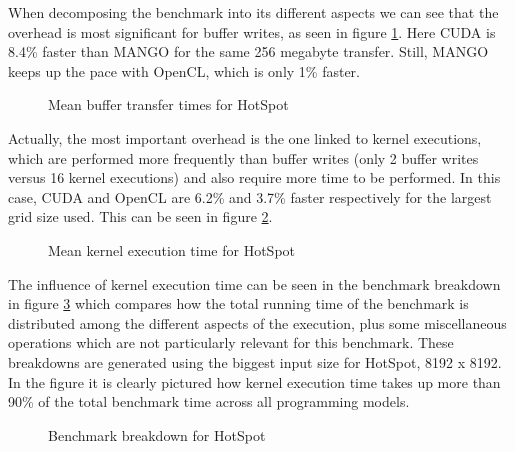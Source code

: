 When decomposing the benchmark into its different aspects we can see that the overhead is most significant for buffer writes, as seen in figure \ref{fig:hotspot_buffer_transfers_mean}. Here CUDA is 8.4\% faster than MANGO for the same 256 megabyte transfer. Still, MANGO keeps up the pace with OpenCL, which is only 1\% faster.

\begin{figure}%
    \centering
    \qquad
    \captionsetup{justification=centering}
    \caption{Mean buffer transfer times for HotSpot}%
    \label{fig:hotspot_buffer_transfers_mean}%
\end{figure}

Actually, the most important overhead is the one linked to kernel executions, which are performed more frequently than buffer writes (only 2 buffer writes versus 16 kernel executions) and also require more time to be performed. In this case, CUDA and OpenCL are 6.2\% and 3.7\% faster respectively for the largest grid size used. This can be seen in figure \ref{fig:hotspot_kernel_executions_mean}.

\begin{figure}
    \centering
    \resizebox{!}{160pt}{
        
    }
    \captionsetup{justification=centering}
    \caption{Mean kernel execution time for HotSpot}
    \label{fig:hotspot_kernel_executions_mean}
\end{figure}

The influence of kernel execution time can be seen in the benchmark breakdown in figure \ref{fig:hotspot_breakdown} which compares how the total running time of the benchmark is distributed among the different aspects of the execution, plus some miscellaneous operations which are not particularly relevant for this benchmark. These breakdowns are generated using the biggest input size for HotSpot, 8192 x 8192. In the figure it is clearly pictured how kernel execution time takes up more than 90\% of the total benchmark time across all programming models.

\begin{figure}
    \centering
    \resizebox{!}{160pt}{
        
    }
    \captionsetup{justification=centering}
    \caption{Benchmark breakdown for HotSpot}
    \label{fig:hotspot_breakdown}
\end{figure}


